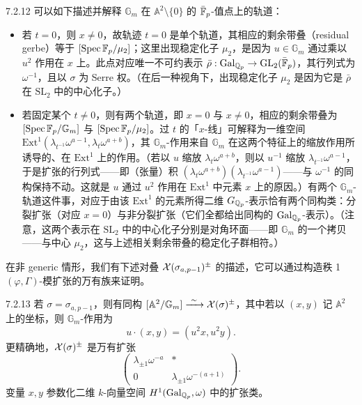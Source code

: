 \begin{rem}{7.2.12}\label{rem:a4-7-2-12}
可以如下描述并解释 $\mathbb G_m$ 在 $\mathbb A^2\setminus\{0\}$ 的 $\bar{\mathbb{F}}_p$-值点上的轨道：
\begin{itemize}
\item 若 $t=0$，则 $x\ne0$，故轨迹 $t=0$ 是单个轨道，其相应的剩余带叠（residual gerbe）等于 $[\operatorname{Spec}\mathbb{F}_p/\mu_2]$；这里出现稳定化子 $\mu_2$，是因为 $u\in\mathbb G_m$ 通过乘以 $u^2$ 作用在 $x$ 上。此点对应唯一不可约表示 $\bar\rho:\operatorname{Gal}_{\mathbb{Q}_p}\to\mathrm{GL}_2(\bar{\mathbb{F}}_p)$，其行列式为 $\omega^{-1}$，且以 $\sigma$ 为 Serre 权。（在后一种视角下，出现稳定化子 $\mu_2$ 是因为它是 $\bar\rho$ 在 $\mathrm{SL}_2$ 中的中心化子。）
\item 若固定某个 $t\ne0$，则有两个轨道，即 $x=0$ 与 $x\ne0$，相应的剩余带叠为 $[\operatorname{Spec}\mathbb{F}_p/\mathbb G_m]$ 与 $[\operatorname{Spec}\mathbb{F}_p/\mu_2]$。过 $t$ 的「$x$-线」可解释为一维空间 $\mathrm{Ext}^1(\lambda_{t^{-1}}\omega^{a-1},\lambda_t\omega^{a+b})$，其 $\mathbb G_m$-作用来自 $\mathbb G_m$ 在这两个特征上的缩放作用所诱导的、在 $\mathrm{Ext}^1$ 上的作用。（若以 $u$ 缩放 $\lambda_t\omega^{a+b}$，则以 $u^{-1}$ 缩放 $\lambda_{t^{-1}}\omega^{a-1}$，于是扩张的行列式——即（张量）积 $(\lambda_t\omega^{a+b})(\lambda_{t^{-1}}\omega^{a-1})$——与 $\omega^{-1}$ 的同构保持不动。这就是 $u$ 通过 $u^2$ 作用在 $\mathrm{Ext}^1$ 中元素 $x$ 上的原因。）有两个 $\mathbb G_m$-轨道这件事，对应于由该 $\mathrm{Ext}^1$ 的元素所得二维 $G_{\mathbb{Q}_p}$-表示恰有两个同构类：分裂扩张（对应 $x=0$）与非分裂扩张（它们全都给出同构的 $\operatorname{Gal}_{\mathbb{Q}_p}$-表示）。（注意，这两个表示在 $\mathrm{SL}_2$ 中的中心化子分别是对角环面——即 $\mathbb G_m$ 的一个拷贝——与中心 $\mu_2$，这与上述相关剩余带叠的稳定化子群相符。）
\end{itemize}
\end{rem}

在非 generic 情形，我们有下述对叠 $\mathcal{X}(\sigma_{a,p-1})^\pm$ 的描述，它可以通过构造秩 1 $(\varphi,\Gamma)$-模扩张的万有族来证明。

\begin{prop}{7.2.13}\label{prop:a4-7-2-13}
若 $\sigma=\sigma_{a,p-1}$，则有同构 $[\mathbb A^2/\mathbb G_m]\xrightarrow{\ \sim\ }\mathcal{X}(\sigma)^\pm$，其中若以 $(x,y)$ 记 $\mathbb A^2$ 上的坐标，则 $\mathbb G_m$-作用为
\[
u\cdot(x,y)=(u^2x,u^2y).
\]
更精确地，$\mathcal{X}(\sigma)^\pm$ 是万有扩张
\[
\begin{pmatrix}
\lambda_{\pm1}\omega^{-a} & *\\
0 & \lambda_{\pm1}\omega^{-(a+1)}
\end{pmatrix}.
\]
变量 $x,y$ 参数化二维 $k$-向量空间 $H^1(\operatorname{Gal}_{\mathbb{Q}_p},\omega)$ 中的扩张类。
\end{prop}

